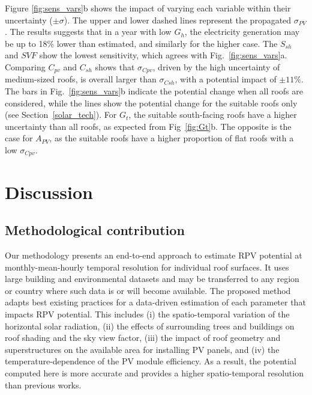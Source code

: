 Figure \ref{fig:sens_vars}b shows the impact of varying each variable within their uncertainty ($\pm \sigma$). 
The upper and lower dashed lines represent the propagated $\sigma_{PV}$. 
The results suggests that in a year with low $G_h$, the electricity generation may be up to 18\% lower than estimated, and similarly for the higher case. 
The $S_{sh}$ and $\mathit{SVF}$ show the lowest sensitivity, which agrees with Fig.~\ref{fig:sens_vars}a.
Comparing $C_{\mathit{pv}}$ and $C_{sh}$ shows that $\sigma_{\mathit{Cpv}}$, driven by the high uncertainty of medium-sized roofs, is overall larger than $\sigma_{\mathit{Csh}}$, with a potential impact of $\pm 11 \%$. 
%
The bars in Fig.~\ref{fig:sens_vars}b indicate the potential change when all roofs are considered, while the lines show the potential change for the suitable roofs only (see Section~\ref{solar_tech}). 
For $G_t$, the suitable south-facing roofs have a higher uncertainty than all roofs, as expected from Fig~\ref{fig:Gt}b. 
The opposite is the case for $A_{PV}$, as the suitable roofs have a higher proportion of flat roofs with a low $\sigma_{\mathit{Cpv}}$.


\section{Discussion}
\label{discussion_pv}

\subsection{Methodological contribution}

Our methodology presents an end-to-end approach to estimate RPV potential at monthly-mean-hourly temporal resolution for individual roof surfaces. It uses large building and environmental datasets and may be transferred to any region or country where such data is or will become available. 
The proposed method adapts best existing practices for a data-driven estimation of each parameter that impacts RPV potential. This includes
(i) the spatio-temporal variation of the horizontal solar radiation,
(ii) the effects of surrounding trees and buildings on roof shading and the sky view factor,
(iii) the impact of roof geometry and superstructures on the available area for installing PV panels, and
(iv) the temperature-dependence of the PV module efficiency.
As a result, the potential computed here is more accurate and provides a higher spatio-temporal resolution than previous works.

